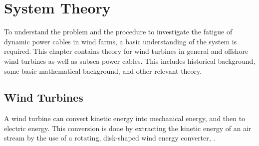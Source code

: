\chapter{System Theory}
\label{chap:sysdes}
To understand the problem and the procedure to investigate the fatigue of dynamic power cables in wind farms, a basic understanding of the system is required. This chapter contains theory for wind turbines in general and offshore wind turbines as well as subsea power cables. This includes historical background, some basic mathematical background, and other relevant theory. 
\section{Wind Turbines}
A wind turbine can convert kinetic energy into mechanical energy, and then to electric energy. This conversion is done by extracting the kinetic energy of an air stream by the use of a rotating, disk-shaped wind energy converter, \cite{Hau2013}.


